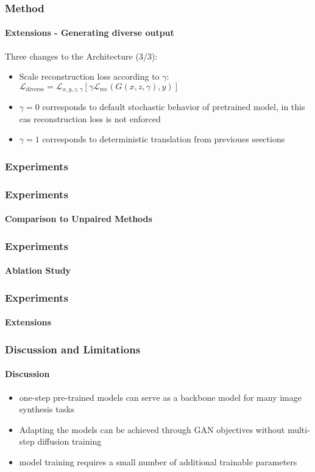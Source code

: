 \documentclass[aspectratio=169, lecture, amberg]{OTHAWbeamer}
\begin{document}
\begin{frame}
    \frametitle{Method}
    \framesubtitle{Extensions - Generating diverse output}
    Three changes to the Architecture (3/3):
    \begin {itemize}
        \item Scale reconstruction loss according to $\gamma$: $\mathcal{L}_{\text{diverse}} = \mathcal{L}_{x,y,z,\gamma} [\gamma\mathcal{L}_{\text{rec}}(G(x,z,\gamma),y)]$
        \item $\gamma = 0$ corresponds to default stochastic behavior of pretrained model, in this cas reconstruction loss is not enforced
        \item $\gamma = 1$ corresponds to deterministic translation from previoues seections
    \end{itemize}
\end{frame}

\begin{frame}
\frametitle{Experiments}

\end{frame}

\begin{frame}
\frametitle{Experiments}
\framesubtitle{Comparison to Unpaired Methods}

\end{frame}

\begin{frame}
\frametitle{Experiments}
\framesubtitle{Ablation Study}

\end{frame}

\begin{frame}
\frametitle{Experiments}
\framesubtitle{Extensions}

\end{frame}

\begin{frame}
\frametitle{Discussion and Limitations}
\framesubtitle{Discussion}
\begin{itemize}
    \item one-step pre-trained models can serve as a backbone model for many image synthesis tasks
    \item Adapting the models can be achieved through GAN objectives without multi-step diffusion training
    \item model training requires a small number of additional trainable parameters
\end{itemize}
\end{frame}
\end{document}
